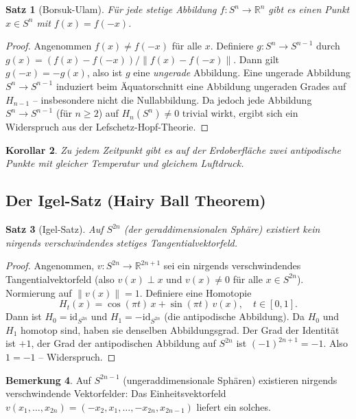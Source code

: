 \documentclass[12pt,a4paper]{amsart}
\newtheorem{theorem}{Satz}[section]
\newtheorem{corollary}[theorem]{Korollar}
\theoremstyle{definition}
\newtheorem{remark}[theorem]{Bemerkung}
\begin{document}
\begin{theorem}[Borsuk-Ulam]
\label{thm:borsuk_ulam}
F\"ur jede stetige Abbildung $f\colon S^n \to \mathbb{R}^n$ gibt es einen Punkt
$x \in S^n$ mit $f(x) = f(-x)$.
\end{theorem}
\begin{proof}
Angenommen $f(x) \neq f(-x)$ f\"ur alle $x$. Definiere
$g\colon S^n \to S^{n-1}$ durch
$g(x) = (f(x) - f(-x)) / \|f(x) - f(-x)\|$.
Dann gilt $g(-x) = -g(x)$, also ist $g$ eine \emph{ungerade} Abbildung.
Eine ungerade Abbildung $S^n \to S^{n-1}$ induziert beim \"Aquatorschnitt
eine Abbildung ungeraden Grades auf $H_{n-1}$ -- insbesondere nicht die
Nullabbildung. Da jedoch jede Abbildung $S^n \to S^{n-1}$ (f\"ur $n \geq 2$)
auf $H_n(S^n) \neq 0$ trivial wirkt, ergibt sich ein Widerspruch aus der
Lefschetz-Hopf-Theorie.
\end{proof}

\begin{corollary}
Zu jedem Zeitpunkt gibt es auf der Erdoberfl\"ache zwei antipodische Punkte mit
gleicher Temperatur und gleichem Luftdruck.
\end{corollary}

\subsection{Der Igel-Satz (Hairy Ball Theorem)}

\begin{theorem}[Igel-Satz]
\label{thm:igelsatz}
Auf $S^{2n}$ (der geraddimensionalen Sph\"are) existiert kein nirgends
verschwindendes stetiges Tangentialvektorfeld.
\end{theorem}
\begin{proof}
Angenommen, $v\colon S^{2n} \to \mathbb{R}^{2n+1}$ sei ein nirgends
verschwindendes Tangentialvektorfeld (also $v(x) \perp x$ und $v(x) \neq 0$
f\"ur alle $x \in S^{2n}$). Normierung auf $\|v(x)\| = 1$. Definiere eine
Homotopie
\[
  H_t(x) = \cos(\pi t)\, x + \sin(\pi t)\, v(x), \quad t \in [0,1].
\]
Dann ist $H_0 = \mathrm{id}_{S^{2n}}$ und $H_1 = -\mathrm{id}_{S^{2n}}$
(die antipodische Abbildung). Da $H_0$ und $H_1$ homotop sind, haben sie
denselben Abbildungsgrad. Der Grad der Identit\"at ist $+1$, der Grad der
antipodischen Abbildung auf $S^{2n}$ ist $(-1)^{2n+1} = -1$.
Also $1 = -1$ -- Widerspruch.
\end{proof}

\begin{remark}
Auf $S^{2n-1}$ (ungeraddimensionale Sph\"aren) existieren nirgends
verschwindende Vektorfelder: Das Einheitsvektorfeld
$v(x_1,\ldots,x_{2n}) = (-x_2,x_1,\ldots,-x_{2n},x_{2n-1})$
liefert ein solches.
\end{remark}
\end{document}
